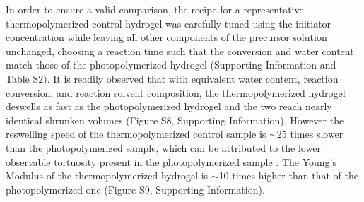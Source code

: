 In order to ensure a valid comparison, the recipe for a representative thermopolymerized control hydrogel was carefully tuned using the initiator concentration while leaving all other components of the precursor solution unchanged, choosing a reaction time such that the conversion and water content match those of the photopolymerized hydrogel (Supporting Information and Table S2). It is readily observed that with equivalent water content, reaction conversion, and reaction solvent composition, the thermopolymerized hydrogel deswells as fast as the photopolymerized hydrogel  and the two reach nearly identical shrunken volumes (Figure S8, Supporting Information). However the reswelling speed of the thermopolymerized control sample is $\sim$25 times slower than the photopolymerized sample, which can be attributed to the lower observable tortuosity present in the photopolymerized sample . The Young's Modulus of the thermopolymerized hydrogel is $\sim$10 times higher than that of the photopolymerized one (Figure S9, Supporting Information). \\


